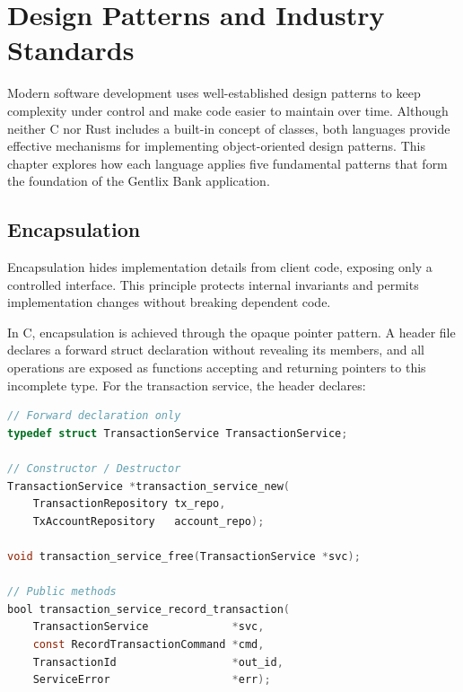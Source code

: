 \chapter{Design Patterns and Industry Standards}
\label{chap:ch4}

\par Modern software development uses well-established design patterns to keep complexity under control and make code easier to maintain over time. Although neither C nor Rust includes a built-in concept of classes, both languages provide effective mechanisms for implementing object-oriented design patterns. This chapter explores how each language applies five fundamental patterns that form the foundation of the Gentlix Bank application.

\section{Encapsulation}
\label{sec:ch4sec1}

Encapsulation hides implementation details from client code, exposing only a
controlled interface. This principle protects internal invariants and permits
implementation changes without breaking dependent code.

In C, encapsulation is achieved through the opaque pointer pattern. A header file
declares a forward struct declaration without revealing its members, and all
operations are exposed as functions accepting and returning pointers to this
incomplete type. For the transaction service, the header declares:

\begin{lstlisting}[language=C, caption={transaction\_service.h --- Opaque pointer
hides internal structure. Client code sees only the forward declaration and
the public function signatures; fields are completely invisible.}]
// Forward declaration only
typedef struct TransactionService TransactionService;

// Constructor / Destructor
TransactionService *transaction_service_new(
    TransactionRepository tx_repo,
    TxAccountRepository   account_repo);

void transaction_service_free(TransactionService *svc);

// Public methods
bool transaction_service_record_transaction(
    TransactionService             *svc,
    const RecordTransactionCommand *cmd,
    TransactionId                  *out_id,
    ServiceError                   *err);
\end{lstlisting}

